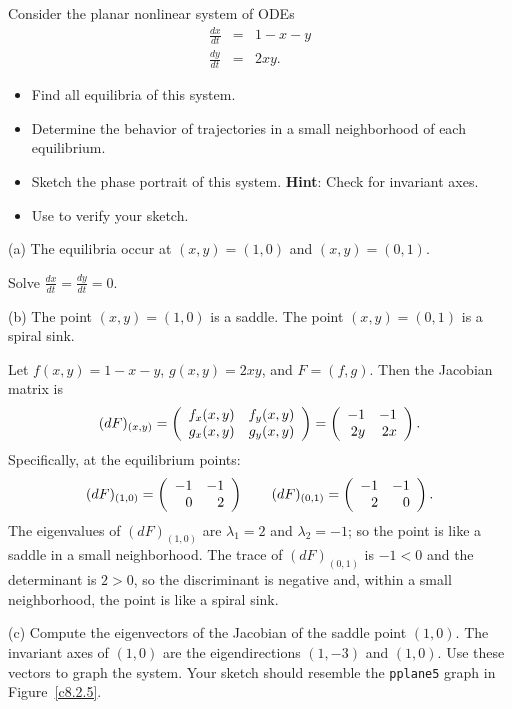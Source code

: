 \documentclass{ximera}
\begin{document}
\begin{exercise} \label{c8.2.5}
Consider the planar nonlinear system of ODEs
\begin{eqnarray*}
\frac{dx}{dt} & = & 1 - x - y \\
\frac{dy}{dt} & = & 2xy. 
\end{eqnarray*}
\begin{itemize}
\item[(a)] Find all equilibria of this system.
\item[(b)] Determine the behavior of trajectories in a small
neighborhood of each equilibrium.
\item[(c)] Sketch the phase portrait of this system.  {\bf Hint}: Check
for invariant axes.
\item[(d)] Use {\pplane} to verify your sketch.
\end{itemize}

\begin{solution}

(a) \ans The equilibria occur at $(x,y) = (1,0)$ and $(x,y) = (0,1)$.

\soln Solve $\frac{dx}{dt} = \frac{dy}{dt} = 0$.

(b) \ans The point $(x,y) = (1,0)$ is a saddle.  The point $(x,y) = (0,1)$
is a spiral sink.

\soln Let $f(x,y) = 1 - x - y$, $g(x,y) = 2xy$,
and $F = (f,g)$.  Then the Jacobian matrix is
\[
(dF)_{(x,y)} = \left(\begin{array}{rr} f_x(x,y) & f_y(x,y)\\ g_x(x,y) &g_y(x,y)\end{array}\right)
= \left(\begin{array}{rr} -1 & -1\\ 2y &2x\end{array}\right).
\]
Specifically, at the equilibrium points:
\[
(dF)_{(1,0)} = \left(\begin{array}{rr} -1 & -1\\ 0 &2\end{array}\right) \qquad
(dF)_{(0,1)} = \left(\begin{array}{rr} -1 & -1\\ 2 &0\end{array}\right).
\]
The eigenvalues of $(dF)_{(1,0)}$ are $\lambda_1 = 2$ and $\lambda_2 = -1$;
so the point is like a saddle in a small neighborhood.  The trace of
$(dF)_{(0,1)}$ is $-1 < 0$ and the determinant is $2 > 0$, so the
discriminant is negative and, within a small neighborhood, the point
is like a spiral sink.

(c) Compute the eigenvectors of the Jacobian of the saddle point $(1,0)$.
The invariant axes of $(1,0)$ are the eigendirections $(1,-3)$ and
$(1,0)$.  Use these vectors to graph the system.  Your sketch should
resemble the {\tt pplane5} graph in Figure~\ref{c8.2.5}.

\begin{figure}[htb]
                       \centerline{%
                       }
\end{figure}


\end{solution}
\end{exercise}
\end{document}
